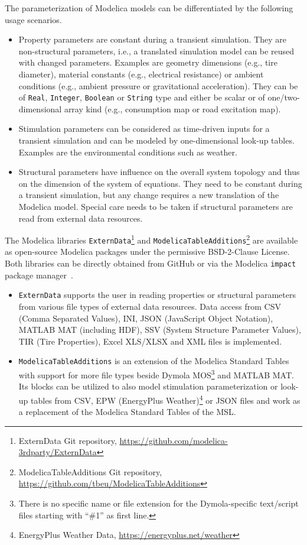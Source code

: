 \documentclass{modelica}
\newcommand{\modelica}[1]{\lstinline[language=modelica]|#1|}
\begin{document}
The parameterization of Modelica models can be differentiated by the following usage scenarios.
\begin{itemize}
 \item Property parameters are constant during a transient simulation. They are non-structural parameters, i.e., a translated simulation model can be reused with changed parameters. Examples are geometry dimensions (e.g., tire diameter), material constants (e.g., electrical resistance) or ambient conditions (e.g., ambient pressure or gravitational acceleration). They can be of \modelica{Real}, \modelica{Integer}, \modelica{Boolean} or \modelica{String} type and either be scalar or of one/two-dimensional array kind (e.g., consumption map or road excitation map).
 \item Stimulation parameters can be considered as time-driven inputs for a transient simulation and can be modeled by one-dimensional look-up tables. Examples are the environmental conditions such as weather.
 \item Structural parameters have influence on the overall system topology and thus on the dimension of the system of equations. They need to be constant during a transient simulation, but any change requires a new translation of the Modelica model. Special care needs to be taken if structural parameters are read from external data resources.
\end{itemize}

The Modelica libraries \modelica{ExternData}\footnote{ExternData Git repository, \url{https://github.com/modelica-3rdparty/ExternData}} and \modelica{ModelicaTableAdditions}\footnote{ModelicaTableAdditions Git repository, \url{https://github.com/tbeu/ModelicaTableAdditions}} are available as open-source Modelica packages under the permissive BSD-2-Clause License.
Both libraries can be directly obtained from GitHub or via the Modelica \modelica{impact} package manager~\cite{impact, Tiller2015WhereIG}.
\begin{itemize}
 \item \modelica{ExternData} supports the user in reading properties or structural parameters from various file types of external data resources.
 Data access from CSV (Comma Separated Values), INI, JSON (JavaScript Object Notation), MATLAB MAT (including HDF), SSV (System Structure Parameter Values), TIR (Tire Properties), Excel XLS/XLSX and XML files is implemented.
 \item \modelica{ModelicaTableAdditions} is an extension of the Modelica Standard Tables~\cite{modelica2014tables} with support for more file types beside Dymola MOS\footnote{There is no specific name or file extension for the Dymola-specific text/script files starting with ``\#1'' as first line.} and MATLAB MAT.
 Its blocks can be utilized to also model stimulation parameterization or look-up tables from CSV, EPW (EnergyPlus Weather)\footnote{EnergyPlus Weather Data, \url{https://energyplus.net/weather}} or JSON files and work as a replacement of the Modelica Standard Tables of the MSL.
\end{itemize}
\end{document}

